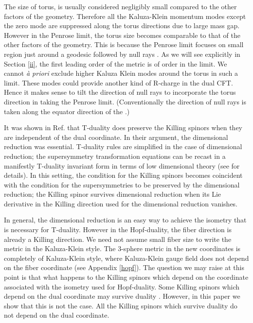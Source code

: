 \documentclass[a4paper,12pt]{article}
\begin{document}
The size of torus, \coordHE{} is usually considered negligibly small compared to the other factors of the geometry. Therefore all the Kaluza-Klein momentum modes except the zero mode are suppressed along the torus directions due to large mass gap. However in the Penrose limit, the torus size becomes comparable to that of the other factors of the geometry. This is because the Penrose limit focuses on small region just around a geodesic followed by null rays \cite{penrose}. As we will see explicitly in Section \ref{ii}, the first leading order of the metric is of order \coordHE{} in the limit. We cannot {\it \`{a} priori} exclude higher Kaluza Klein modes around the torus in such a limit. These modes could provide another kind of R-charge in the dual CFT. Hence it makes sense to tilt the direction of null rays to incorporate the torus direction in taking the Penrose limit. (Conventionally the direction of null rays is taken along the equator direction of the \coordHE{}.)

It was shown in Ref. \cite{bergshoeff} that T-duality does preserve the Killing spinors when they are independent of the dual coordinate. In their argument, the dimensional reduction was essential. T-duality rules are simplified in the case of dimensional reduction; the supersymmetry transformation equations can be recast in a manifestly T-duality invariant form in terms of low dimensional theory (see \cite{bergshoeff} for details). In this setting, the condition for the Killing spinors becomes coincident with the condition for the supersymmetries to be preserved by the dimensional reduction; the Killing spinor survives dimensional reduction when its Lie derivative in the Killing direction used for the dimensional reduction vanishes. 

In general, the dimensional reduction is an easy way to achieve the isometry that is necessary for T-duality. However in the Hopf-duality, the fiber direction is already a Killing direction. We need not assume small fiber size to write the metric in the Kaluza-Klein style. The 3-sphere metric in the new coordinates is completely of Kaluza-Klein style, where Kaluza-Klein gauge field does not depend on the fiber coordinate (see Appendix \ref{hopf}). The question we may raise at this point is that what happens to the Killing spinors which depend on the coordinate associated with the isometry used for Hopf-duality. Some Killing spinors which depend on the dual coordinate may survive duality \cite{gueven2}. However, in this paper we show that this is not the case. All the Killing spinors which survive duality do not depend on the dual coordinate.
\end{document}
